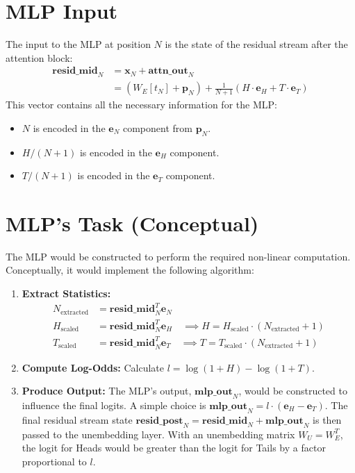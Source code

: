 \documentclass{article}
\begin{document}
\section{MLP Input}
The input to the MLP at position $N$ is the state of the residual stream after the attention block:
\begin{align}
    \mathbf{resid\_mid}_N &= \mathbf{x}_N + \mathbf{attn\_out}_N \\
    &= (W_E[t_N] + \mathbf{p}_N) + \frac{1}{N+1} (H \cdot \mathbf{e}_H + T \cdot \mathbf{e}_T)
\end{align}
This vector contains all the necessary information for the MLP:
\begin{itemize}
    \item $N$ is encoded in the $\mathbf{e}_N$ component from $\mathbf{p}_N$.
    \item $H/(N+1)$ is encoded in the $\mathbf{e}_H$ component.
    \item $T/(N+1)$ is encoded in the $\mathbf{e}_T$ component.
\end{itemize}

\section{MLP's Task (Conceptual)}
The MLP would be constructed to perform the required non-linear computation. Conceptually, it would implement the following algorithm:
\begin{enumerate}
    \item \textbf{Extract Statistics:}
    \begin{align*}
        N_{\text{extracted}} &= \mathbf{resid\_mid}_N^T \mathbf{e}_N \\
        H_{\text{scaled}} &= \mathbf{resid\_mid}_N^T \mathbf{e}_H \quad \implies H = H_{\text{scaled}} \cdot (N_{\text{extracted}}+1) \\
        T_{\text{scaled}} &= \mathbf{resid\_mid}_N^T \mathbf{e}_T \quad \implies T = T_{\text{scaled}} \cdot (N_{\text{extracted}}+1)
    \end{align*}
    \item \textbf{Compute Log-Odds:} Calculate $l = \log(1+H) - \log(1+T)$.
    \item \textbf{Produce Output:} The MLP's output, $\mathbf{mlp\_out}_N$, would be constructed to influence the final logits. A simple choice is $\mathbf{mlp\_out}_N = l \cdot (\mathbf{e}_H - \mathbf{e}_T)$. The final residual stream state $\mathbf{resid\_post}_N = \mathbf{resid\_mid}_N + \mathbf{mlp\_out}_N$ is then passed to the unembedding layer. With an unembedding matrix $W_U = W_E^T$, the logit for Heads would be greater than the logit for Tails by a factor proportional to $l$.
\end{enumerate}
\end{document}
